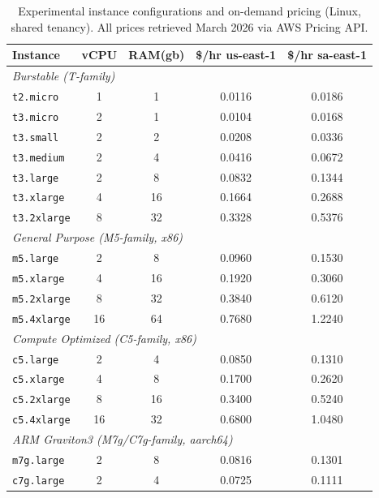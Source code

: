 \documentclass[conference]{IEEEtran}
\begin{document}
\begin{table}[!htbp]
	\centering
	\caption{Experimental instance configurations and on-demand pricing (Linux, shared tenancy). All prices retrieved March 2026 via AWS Pricing API.}
	\label{tab:experimental_configurations}
	\begin{tabular}{|l|c|c|c|c|}
		\hline
		\textbf{Instance} & \textbf{vCPU} & \textbf{RAM(gb)} & \textbf{\$/hr us-east-1} & \textbf{\$/hr sa-east-1} \\
		\hline
		\multicolumn{5}{|l|}{\textit{Burstable (T-family)}} \\
		\hline
		\texttt{t2.micro}   & 1  & 1  & 0.0116 & 0.0186 \\
		\texttt{t3.micro}   & 2  & 1  & 0.0104 & 0.0168 \\
		\texttt{t3.small}   & 2  & 2  & 0.0208 & 0.0336 \\
		\texttt{t3.medium}  & 2  & 4  & 0.0416 & 0.0672 \\
		\texttt{t3.large}   & 2  & 8  & 0.0832 & 0.1344 \\
		\texttt{t3.xlarge}  & 4  & 16 & 0.1664 & 0.2688 \\
		\texttt{t3.2xlarge} & 8  & 32 & 0.3328 & 0.5376 \\
		\hline
		\multicolumn{5}{|l|}{\textit{General Purpose (M5-family, x86)}} \\
		\hline
		\texttt{m5.large}   & 2  & 8  & 0.0960 & 0.1530 \\
		\texttt{m5.xlarge}  & 4  & 16 & 0.1920 & 0.3060 \\
		\texttt{m5.2xlarge} & 8  & 32 & 0.3840 & 0.6120 \\
		\texttt{m5.4xlarge} & 16 & 64 & 0.7680 & 1.2240 \\
		\hline
		\multicolumn{5}{|l|}{\textit{Compute Optimized (C5-family, x86)}} \\
		\hline
		\texttt{c5.large}   & 2  & 4  & 0.0850 & 0.1310 \\
		\texttt{c5.xlarge}  & 4  & 8  & 0.1700 & 0.2620 \\
		\texttt{c5.2xlarge} & 8  & 16 & 0.3400 & 0.5240 \\
		\texttt{c5.4xlarge} & 16 & 32 & 0.6800 & 1.0480 \\
		\hline
		\multicolumn{5}{|l|}{\textit{ARM Graviton3 (M7g/C7g-family, aarch64)}} \\
		\hline
		\texttt{m7g.large}  & 2  & 8  & 0.0816 & 0.1301 \\
		\texttt{c7g.large}  & 2  & 4  & 0.0725 & 0.1111 \\
		\hline
	\end{tabular}
\end{table}
\end{document}
